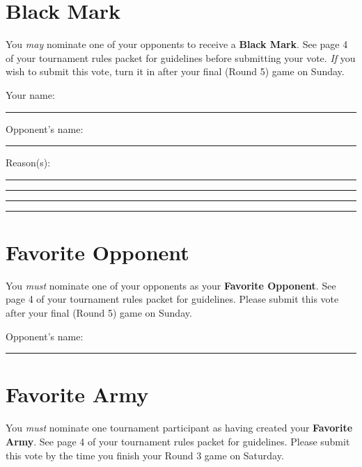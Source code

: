 \documentclass[10pt,titlepage]{article}
\newcommand{\dottedline}{\noindent\hdashrule{6.6in}{.5pt}{3pt 2pt}}
\begin{document}
\newpage

\pagestyle{empty}
\section*{Black Mark}

You \textit{may} nominate one of your opponents to receive a \textbf{Black Mark}. See page 4 of your tournament rules packet for guidelines before submitting your vote. \textit{If} you wish to submit this vote, turn it in after your final (Round 5) game on Sunday.

\vspace{24pt}

\noindent Your name: \rule{2in}{.5pt}\hspace{.5in}Opponent's name: \rule{2in}{.5pt}

\vspace{12pt}
\noindent Reason(s): \rule{5.8in}{.5pt}

\vspace{12pt}
\noindent\rule{6.5in}{.5pt}

\vspace{12pt}
\noindent\rule{6.5in}{.5pt}

\vspace{12pt}
\noindent\rule{6.5in}{.5pt}

\vspace{12pt}
\dottedline

\section*{Favorite Opponent}

You \textit{must} nominate one of your opponents as your \textbf{Favorite Opponent}. See page 4 of your tournament rules packet for guidelines. Please submit this vote after your final (Round 5) game on Sunday.

\vspace{12pt}
\noindent Opponent's name: \rule{5.25in}{.5pt}

\vspace{144pt}
\dottedline

\section*{Favorite Army}

You \textit{must} nominate one tournament participant as having created your \textbf{Favorite Army}. See page 4 of your tournament rules packet for guidelines. Please submit this vote by the time you finish your Round 3 game on Saturday.
\end{document}
